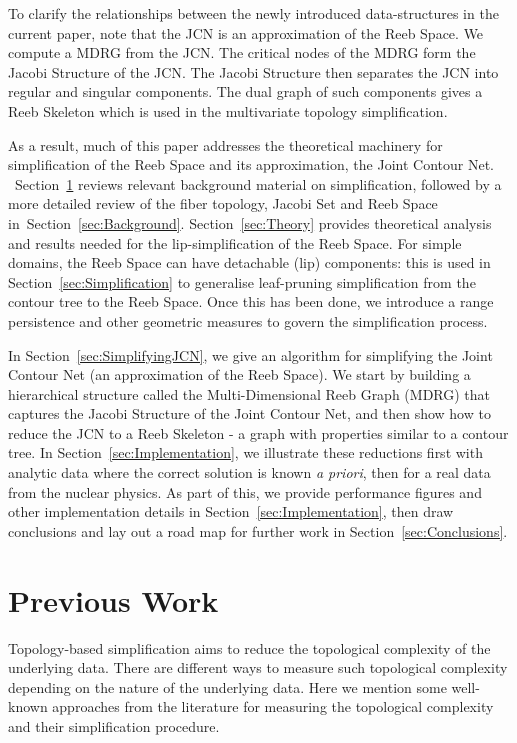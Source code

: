 \documentclass[twocolumn]{article}
\newcommand{\secref}[1]{Section~\ref{sec:#1}}
\begin{document}
To clarify the relationships between the newly introduced
data-structures in the current paper, note
that the JCN is an approximation of the Reeb Space. We compute 
a MDRG from the JCN. The critical nodes of
the MDRG form the Jacobi Structure of the JCN. The  Jacobi Structure then
separates the JCN into regular and singular components. The dual graph
of such components gives a Reeb Skeleton which is used in the
multivariate topology simplification.

As a result, much of this paper addresses the theoretical machinery for simplification of the 
Reeb Space and its approximation, the Joint Contour Net. ~\secref{PreviousWork} reviews 
relevant background material on simplification, followed by a more
detailed review of the fiber topology, Jacobi Set and Reeb Space in~\secref{Background}.  \secref{Theory} provides
theoretical analysis and results needed for the lip-simplification of
the Reeb Space. For simple domains, the Reeb Space can have detachable
(lip) components: this is used in \secref{Simplification} to generalise leaf-pruning simplification from the
contour tree to the Reeb Space.  Once this has been done, we introduce a range persistence and
other geometric measures to govern the simplification process.  

In \secref{SimplifyingJCN}, we give an algorithm for simplifying the Joint Contour 
Net (an approximation of the Reeb Space). We start by building a hierarchical structure called the Multi-Dimensional Reeb
Graph (MDRG) that captures the Jacobi Structure of the Joint Contour Net,
and then show how to reduce the JCN to a Reeb Skeleton - a graph with properties similar to a contour tree. 
In \secref{Implementation}, we illustrate these reductions first with 
analytic data where the correct solution is known \emph{a priori},
then for a real data from the nuclear physics. As part of this, we provide performance figures and other implementation details in 
\secref{Implementation}, then draw conclusions and lay out a road map
for further work in \secref{Conclusions}.



%
 \section{Previous Work}
\label{sec:PreviousWork}
Topology-based simplification aims to reduce the topological
complexity of the underlying data. There are different ways to
measure such topological complexity depending on the nature of the
underlying data. Here we mention some well-known approaches from the
literature for measuring the topological complexity and their
simplification procedure. 
\end{document}
